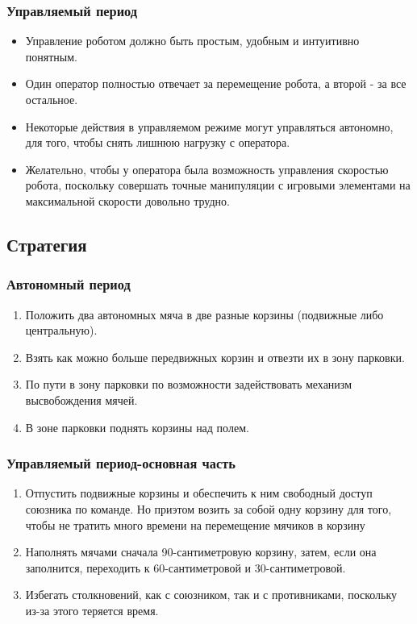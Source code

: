 \subsubsection{Управляемый период}
\begin{itemize}
	\item Управление роботом должно быть простым, удобным и интуитивно понятным.
	\item Один оператор полностью отвечает за перемещение робота, а второй - за все остальное.
	\item Некоторые действия в управляемом режиме могут управляться автономно, для того, чтобы снять лишнюю нагрузку с оператора.
	\item Желательно, чтобы у оператора была возможность управления скоростью робота, поскольку совершать точные манипуляции с игровыми элементами на максимальной скорости довольно трудно.
\end{itemize}

\fillpage

\subsection{Стратегия} 
\subsubsection{Автономный период}
\begin{enumerate}
    \item Положить два автономных мяча в две разные корзины (подвижные либо центральную).
	\item Взять как можно больше передвижных корзин и отвезти их в зону парковки.
	\item По пути в зону парковки по возможности задействовать механизм высвобождения мячей.
	\item В зоне парковки поднять корзины над полем.         
\end{enumerate}
\subsubsection{Управляемый период-основная часть}
\begin{enumerate}
	\item Отпустить подвижные корзины и обеспечить к ним свободный доступ союзника по команде. Но приэтом возить за собой одну корзину для того, чтобы не тратить много времени на перемещение мячиков в корзину
	\item Наполнять мячами сначала 90-сантиметровую корзину, затем, если она заполнится, переходить к 60-сантиметровой и 30-сантиметровой.
	\item Избегать столкновений, как с союзником, так и с противниками, поскольку из-за этого теряется время.
\end{enumerate}
